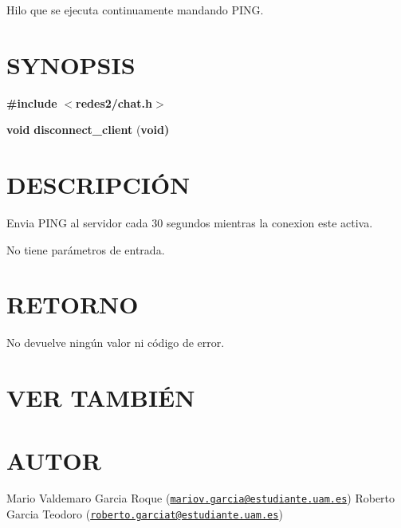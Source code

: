 Hilo que se ejecuta continuamente mandando P\-I\-N\-G.\hypertarget{getTamanoFichero_SYNOPSIS}{}\section{S\-Y\-N\-O\-P\-S\-I\-S}\label{getTamanoFichero_SYNOPSIS}
{\bfseries \#include} {\bfseries $<$redes2/chat.\-h$>$} 

{\bfseries void} {\bfseries disconnect\-\_\-client} {\bfseries }({\bfseries void{\bfseries })} \hypertarget{getTamanoFichero_descripcion}{}\section{D\-E\-S\-C\-R\-I\-P\-C\-IÓ\-N}\label{getTamanoFichero_descripcion}
Envia P\-I\-N\-G al servidor cada 30 segundos mientras la conexion este activa.

No tiene parámetros de entrada.\hypertarget{getTamanoFichero_retorno}{}\section{R\-E\-T\-O\-R\-N\-O}\label{getTamanoFichero_retorno}
No devuelve ningún valor ni código de error.\hypertarget{servidorArchivo_seealso}{}\section{V\-E\-R T\-A\-M\-B\-IÉ\-N}\label{servidorArchivo_seealso}
{\bfseries } \hypertarget{getTamanoFichero_authors}{}\section{A\-U\-T\-O\-R}\label{getTamanoFichero_authors}
Mario Valdemaro Garcia Roque (\href{mailto:mariov.garcia@estudiante.uam.es}{\tt mariov.\-garcia@estudiante.\-uam.\-es}) Roberto Garcia Teodoro (\href{mailto:roberto.garciat@estudiante.uam.es}{\tt roberto.\-garciat@estudiante.\-uam.\-es}) 